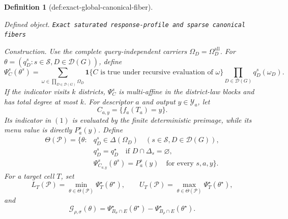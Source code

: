 \documentclass{article}
\newtheorem{definition}{Definition}
\begin{document}
\begin{definition}[def:exact-global-canonical-fiber]\label{def:exact-global-canonical-fiber}
\par\smallskip\noindent\emph{Defined object.} \texttt{Exact saturated response-\allowbreak{}profile and sparse canonical fibers}
\par\smallskip\noindent\emph{Construction.} Use the complete query-independent carriers \(\Omega_D=\Omega_D^{\mathrm{all}}\).  For \(\theta=(q_D^s:s\in\mathcal S,D\in\mathcal D(G))\), define
\[
\Psi_C^s(\theta^s)=
\sum_{\omega\in\prod_{D\in\mathcal D(G)}\Omega_D}
\mathbf 1\{C\text{ is true under recursive evaluation of }\omega\}
\prod_{D\in\mathcal D(G)}q_D^s(\omega_D).
\tag{1}
\]
If the indicator visits \(k\) districts, \(\Psi_C^s\) is multi-affine in the district-law blocks and has total degree at most \(k\).  For descriptor \(a\) and output \(y\in\mathcal Y_a\), let
\[
C_{a,y}=\{f_a(T_a)=y\}.
\]
Its indicator in \((1)\) is evaluated by the finite deterministic preimage, while its menu value is directly \(P_a^s(y)\).  Define
\[
\begin{split}
\Theta(\mathcal P)=\bigl\{\theta:{}&
q_D^s\in\Delta(\Omega_D)
\quad(s\in\mathcal S,D\in\mathcal D(G)),\\
&q_D^s=q_D^\star
\quad\text{if }D\cap\Delta_s=\varnothing,\\
&\Psi_{C_{a,y}}^s(\theta^s)=P_a^s(y)
\quad\text{for every }s,a,y\bigr\}.
\end{split}
\tag{2}
\]
For a target cell \(T\), set
\[
L_T(\mathcal P)=\min_{\theta\in\Theta(\mathcal P)}
\Psi_T^\star(\theta^\star),
\qquad
U_T(\mathcal P)=\max_{\theta\in\Theta(\mathcal P)}
\Psi_T^\star(\theta^\star),
\]
and
\[
\mathcal G_{\rho,\sigma}(\theta)=
\Psi_{B_\sigma\cap E}^\star(\theta^\star)
-\Psi_{B_\rho\cap E}^\star(\theta^\star).
\]


\end{definition}
\end{document}
